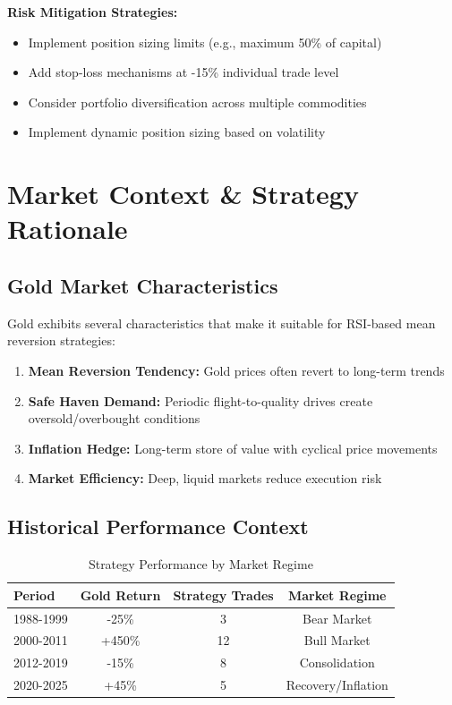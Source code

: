 \documentclass[11pt,a4paper]{article}
\begin{document}
\textbf{Risk Mitigation Strategies:}
\begin{itemize}
    \item Implement position sizing limits (e.g., maximum 50\% of capital)
    \item Add stop-loss mechanisms at -15\% individual trade level
    \item Consider portfolio diversification across multiple commodities
    \item Implement dynamic position sizing based on volatility
\end{itemize}

\newpage

\section{Market Context \& Strategy Rationale}

\subsection{Gold Market Characteristics}

Gold exhibits several characteristics that make it suitable for RSI-based mean reversion strategies:

\begin{enumerate}
    \item \textbf{Mean Reversion Tendency:} Gold prices often revert to long-term trends
    \item \textbf{Safe Haven Demand:} Periodic flight-to-quality drives create oversold/overbought conditions
    \item \textbf{Inflation Hedge:} Long-term store of value with cyclical price movements
    \item \textbf{Market Efficiency:} Deep, liquid markets reduce execution risk
\end{enumerate}

\subsection{Historical Performance Context}

\begin{table}[H]
\centering
\begin{tabular}{lccc}
\toprule
\textbf{Period} & \textbf{Gold Return} & \textbf{Strategy Trades} & \textbf{Market Regime} \\
\midrule
1988-1999 & -25\% & 3 & Bear Market \\
2000-2011 & +450\% & 12 & Bull Market \\
2012-2019 & -15\% & 8 & Consolidation \\
2020-2025 & +45\% & 5 & Recovery/Inflation \\
\bottomrule
\end{tabular}
\caption{Strategy Performance by Market Regime}
\end{table}
\end{document}
